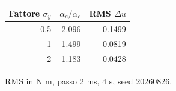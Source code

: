 \begin{tabular}{rrr}\toprule
Fattore $\sigma_y$ & $\alpha_e/\alpha_c$ & RMS $\Delta u$ \\
\midrule
0.5 & 2.096 & 0.1499 \\
1 & 1.499 & 0.0819 \\
2 & 1.183 & 0.0428 \\
\bottomrule\end{tabular}
\par\scriptsize RMS in N m, passo 2 ms, 4 s, seed 20260826.\small
